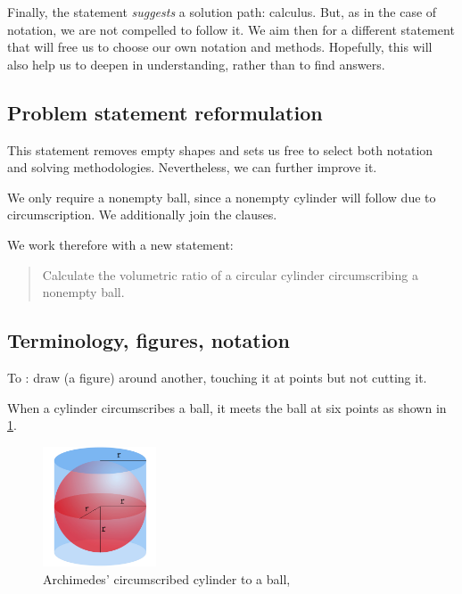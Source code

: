  Finally, the statement \emph{suggests} a solution path: calculus. But, as in the case of notation, we are not compelled to follow it. We aim then for a different statement that will free us to choose our own notation and methods. Hopefully, this will also help us to deepen in understanding, rather than to find  answers.



\subsection{Problem statement reformulation} %
\label{sub:problem_statement_reformulation}
%
  

 This statement removes empty shapes and sets us free to select both notation and solving methodologies. Nevertheless, we can further improve it.

 We only require a nonempty ball, since a nonempty cylinder will follow due to circumscription. We additionally join the clauses.

 We work therefore with a new statement:
%
\begin{quotation}
  Calculate the volumetric ratio of a circular cylinder circumscribing a nonempty ball.
\end{quotation}



\subsection{Terminology, figures, notation} %
\label{sub:terminology_and_notation}

 To : draw (a figure) around another, touching it at points but not cutting it. 

 When a cylinder circumscribes a ball, it meets the ball at six points as shown in \cref{fig:archimedes}.
%
\begin{figure}[b]
  \capstart
  \centering
  \includegraphics[width=0.3\textwidth]{./graph/archimedes}
  \caption{Archimedes' circumscribed cylinder to a ball, \citep{wiki:archimedes}}
  \label{fig:archimedes}
\end{figure}

